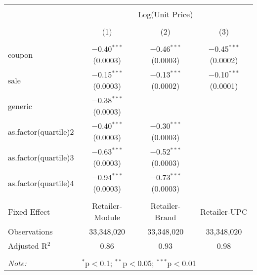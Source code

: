 
\begin{table}[!htbp] \centering 
  \caption{} 
  \label{tab:overallSavingsStorable} 
\begin{tabular}{@{\extracolsep{5pt}}lccc} 
\\[-1.8ex]\hline 
\hline \\[-1.8ex] 
 & \multicolumn{3}{c}{Log(Unit Price)} \\ 
\\[-1.8ex] & (1) & (2) & (3)\\ 
\hline \\[-1.8ex] 
 coupon & $-$0.40$^{***}$ (0.0003) & $-$0.46$^{***}$ (0.0003) & $-$0.45$^{***}$ (0.0002) \\ 
  sale & $-$0.15$^{***}$ (0.0003) & $-$0.13$^{***}$ (0.0002) & $-$0.10$^{***}$ (0.0001) \\ 
  generic & $-$0.38$^{***}$ (0.0003) &  &  \\ 
  as.factor(quartile)2 & $-$0.40$^{***}$ (0.0003) & $-$0.30$^{***}$ (0.0003) &  \\ 
  as.factor(quartile)3 & $-$0.63$^{***}$ (0.0003) & $-$0.52$^{***}$ (0.0003) &  \\ 
  as.factor(quartile)4 & $-$0.94$^{***}$ (0.0003) & $-$0.73$^{***}$ (0.0003) &  \\ 
 \hline \\[-1.8ex] 
Fixed Effect & Retailer-Module & Retailer-Brand & Retailer-UPC \\ 
Observations & 33,348,020 & 33,348,020 & 33,348,020 \\ 
Adjusted R$^{2}$ & 0.86 & 0.93 & 0.98 \\ 
\hline 
\hline \\[-1.8ex] 
\textit{Note:}  & \multicolumn{3}{l}{$^{*}$p$<$0.1; $^{**}$p$<$0.05; $^{***}$p$<$0.01} \\ 
\end{tabular} 
\end{table} 
